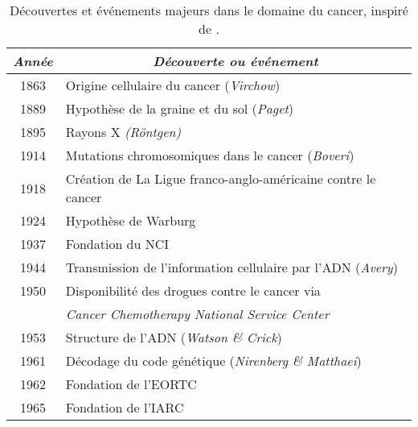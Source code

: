 			\begin{table}
				\begin{center}
					\caption{Découvertes et événements majeurs dans le domaine du cancer, inspiré de \citet{Devita2012}.}
					\begin{tabular}{cl}
						\toprule
						\emph{Année}  & \multicolumn{1}{c}{\emph{Découverte ou événement}}                                      \\
						\midrule
						1863          & Origine cellulaire du cancer (\emph{Virchow})                                           \\
						1889          & Hypothèse de la graine et du sol (\emph{Paget})                                         \\
						1895          & Rayons X \emph{(Röntgen)}                                                               \\
						1914          & Mutations chromosomiques dans le cancer (\emph{Boveri})                                 \\
						1918          & Création de La Ligue franco-anglo-américaine contre le cancer                           \\
						1924          & Hypothèse de Warburg                                                                    \\
						1937          & Fondation du \ac{NCI}                                                                   \\
						1944          & Transmission de l'information cellulaire par l'\acs{ADN} (\emph{Avery})                 \\
						1950          & Disponibilité des drogues contre le cancer via                                          \\
													& \emph{Cancer Chemotherapy National Service Center}                                      \\
						1953          & Structure de l'\acs{ADN} (\emph{Watson \& Crick})                                       \\
						1961          & Décodage du code génétique (\emph{Nirenberg \& Matthaei})                               \\
						1962          & Fondation de l'\ac{EORTC}                                                               \\
						1965          & Fondation de l'\ac{IARC}                                                                \\

\end{tabular}
\end{center}
\end{table}
